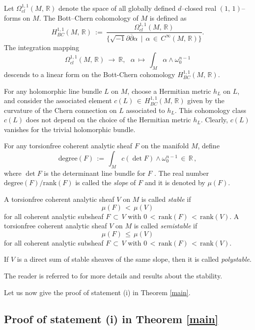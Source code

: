 \documentclass[12pt,reqno]{amsart}
\theoremstyle{definition}
\numberwithin{equation}{section}
\begin{document}
Let $\Omega^{1,1}_{cl}(M,\, {\mathbb R})$ denote the space of all globally
defined $d$--closed real $(1,\, 1)$--forms on $M$. The Bott--Chern cohomology of $M$ is defined as 
$$
H^{1,1}_{BC}(M,\, {\mathbb R})\ :=\ \frac{\Omega^{1,1}_{cl}(M,\, {\mathbb R})}{
\{\sqrt{-1}\partial\overline{\partial}\alpha\,\mid\, \alpha\,\in\,
C^{\infty}(M,\,{\mathbb R})\}} .
$$
The integration mapping 
$$
\Omega^{1,1}_{cl}(M,\, {\mathbb R})\ \longrightarrow\ {\mathbb R},\ \ \
\alpha\ \longmapsto\ \int_M \alpha\wedge \omega^{n-1}_0
$$
descends to a linear form on the Bott-Chern cohomology $H^{1,1}_{BC}(M,\, {\mathbb R})$.

For any holomorphic line bundle $L$ on $M$, choose a Hermitian metric $h_L$ on $L$, and consider the 
associated element $c(L)\,\in\, H^{1,1}_{BC}(M,\, {\mathbb R})$ given by the curvature of the Chern 
connection on $L$ associated to $h_L$. This cohomology class $c(L)$ does not depend on the choice of the 
Hermitian metric $h_L$. Clearly, $c(L)$ vanishes for the trivial holomorphic bundle.

For any torsionfree coherent analytic sheaf $F$ on the manifold $M$, define
$$
\text{degree}(F)\,:=\, \int_M c(\det F)\wedge \omega^{n-1}_0\, \in\, \mathbb R\, ,
$$
where $\det F$ is the determinant line bundle for
$F$ \cite[p.~166, Proposition~6.10]{Ko}. The real number
$\text{degree}(F)/\text{rank}(F)$ is called the \textit{slope} of $F$ and it is denoted
by $\mu(F)$. 

A torsionfree coherent analytic sheaf $V$ on $M$ is called
\textit{stable} if
$$
\mu(F)\, <\, \mu(V)
$$
for all coherent analytic subsheaf $F\, \subset\, V$ with $0\, <\, \text{rank}(F)\,
<\, \text{rank}(V)$. A torsionfree coherent analytic sheaf $V$ on $M$ is called
\textit{semistable} if
$$
\mu(F)\, \leq \, \mu(V)
$$
for all coherent analytic subsheaf $F\, \subset\, V$ with $0\, <\, \text{rank}(F)\,
<\, \text{rank}(V)$.

If $V$ is a direct sum of stable sheaves of the same slope, then it is
called \textit{polystable}. 

The reader is referred to \cite{LT} for more details and results about the stability.

Let us now give the proof of statement (i) in Theorem \ref{main}.

\subsection{Proof of statement (i) in Theorem \ref{main}}\label{sest1}
\end{document}

